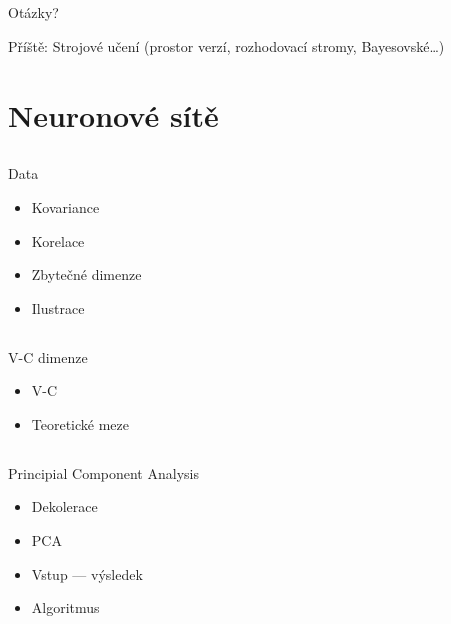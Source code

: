 \documentclass{beamer}
\begin{document}
\subsection{}
\begin{frame}{Otázky?}
\begin{center}
Příště: Strojové učení (prostor verzí, rozhodovací stromy, Bayesovské\dots)
\end{center}
\end{frame}

\section{Neuronové sítě}

\subsection{}
\begin{frame}{Data}
\begin{itemize}
\item Kovariance
\item Korelace
\item Zbytečné dimenze
\item Ilustrace
\end{itemize}
\end{frame}

\subsection{}
\begin{frame}{V-C dimenze}
\begin{itemize}
\item V-C
\item Teoretické meze
\end{itemize}
\end{frame}

\subsection{}
\begin{frame}{Principial Component Analysis}
\begin{itemize}
\item Dekolerace
\item PCA
\item Vstup --- výsledek
\item Algoritmus
\end{itemize}
\end{frame}
\end{document}
